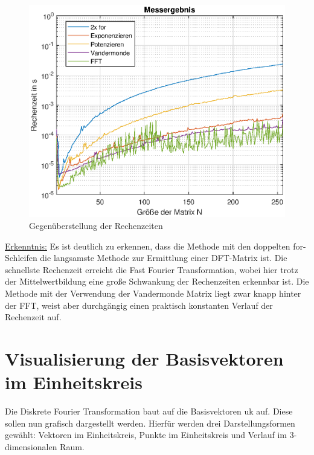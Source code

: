 \documentclass[12pt,a4paper]{article}
\begin{document}
	\begin{figure}[H]
		\centering
		\includegraphics[width=0.9\linewidth]{messergebnis_rechenzeit}
		\caption{Gegenüberstellung der Rechenzeiten}
		\label{fig:messrech}
	\end{figure}

	\underline{Erkenntnis:} Es ist deutlich zu erkennen, dass die Methode mit den doppelten for-Schleifen die langsamste Methode zur Ermittlung einer DFT-Matrix ist. Die schnellste Rechenzeit erreicht die Fast Fourier Transformation, wobei hier trotz der Mittelwertbildung eine große Schwankung der Rechenzeiten erkennbar ist. Die Methode mit der Verwendung der Vandermonde Matrix liegt zwar knapp hinter der FFT, weist aber durchgängig einen praktisch konstanten Verlauf der Rechenzeit auf.

	\pagebreak

	\section{Visualisierung der Basisvektoren im Einheitskreis}
	Die Diskrete Fourier Transformation baut auf die Basisvektoren uk auf. 
	Diese sollen nun grafisch dargestellt werden. Hierfür werden drei Darstellungsformen gewählt: Vektoren im Einheitskreis, Punkte im Einheitskreis und Verlauf im 3-dimensionalen Raum.
	
%	
	
\end{document}
